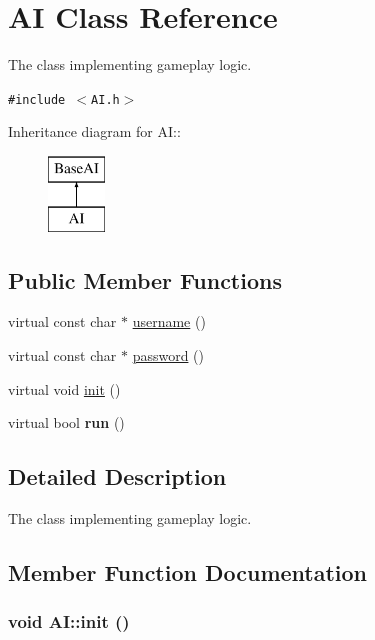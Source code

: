 \hypertarget{classAI}{
\section{AI Class Reference}
\label{classAI}
}
The class implementing gameplay logic.  


{\tt \#include $<$AI.h$>$}

Inheritance diagram for AI::\begin{figure}[H]
\begin{center}
\leavevmode
\includegraphics[height=2cm]{classAI}
\end{center}
\end{figure}
\subsection*{Public Member Functions}
\begin{CompactItemize}
\item 
virtual const char $\ast$ \hyperlink{classAI_529ac74a6f88a82abb1edd87847203e1}{username} ()
\item 
virtual const char $\ast$ \hyperlink{classAI_a4e58e11bbbdb040e6b12f8706763a00}{password} ()
\item 
virtual void \hyperlink{classAI_8c8e3a635791abaa61585357e6a25f63}{init} ()
\item 
\hypertarget{classAI_3c4746756b699cee5225597506521a39}{
virtual bool \textbf{run} ()}
\label{classAI_3c4746756b699cee5225597506521a39}

\end{CompactItemize}


\subsection{Detailed Description}
The class implementing gameplay logic. 

\subsection{Member Function Documentation}
\hypertarget{classAI_8c8e3a635791abaa61585357e6a25f63}{
\subsubsection[{init}]{\setlength{\rightskip}{0pt plus 5cm}void AI::init ()}}
\label{classAI_8c8e3a635791abaa61585357e6a25f63}



